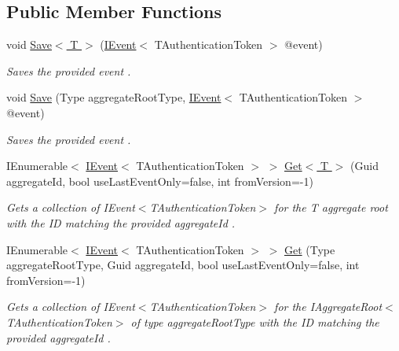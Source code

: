 \subsection*{Public Member Functions}
\begin{DoxyCompactItemize}
\item 
void \hyperlink{interfaceCqrs_1_1Events_1_1IEventStore_a92e768243d6602d09b786bbd06811ce6_a92e768243d6602d09b786bbd06811ce6}{Save$<$ T $>$} (\hyperlink{interfaceCqrs_1_1Events_1_1IEvent}{I\+Event}$<$ T\+Authentication\+Token $>$ @event)
\begin{DoxyCompactList}\small\item\em Saves the provided {\itshape event} . \end{DoxyCompactList}\item 
void \hyperlink{interfaceCqrs_1_1Events_1_1IEventStore_a81fb586703e7c6dea6b23d9a95f3887a_a81fb586703e7c6dea6b23d9a95f3887a}{Save} (Type aggregate\+Root\+Type, \hyperlink{interfaceCqrs_1_1Events_1_1IEvent}{I\+Event}$<$ T\+Authentication\+Token $>$ @event)
\begin{DoxyCompactList}\small\item\em Saves the provided {\itshape event} . \end{DoxyCompactList}\item 
I\+Enumerable$<$ \hyperlink{interfaceCqrs_1_1Events_1_1IEvent}{I\+Event}$<$ T\+Authentication\+Token $>$ $>$ \hyperlink{interfaceCqrs_1_1Events_1_1IEventStore_add6227e2978ff8656aad79b1a51bf34c_add6227e2978ff8656aad79b1a51bf34c}{Get$<$ T $>$} (Guid aggregate\+Id, bool use\+Last\+Event\+Only=false, int from\+Version=-\/1)
\begin{DoxyCompactList}\small\item\em Gets a collection of I\+Event$<$\+T\+Authentication\+Token$>$ for the {\itshape T} aggregate root with the ID matching the provided {\itshape aggregate\+Id} . \end{DoxyCompactList}\item 
I\+Enumerable$<$ \hyperlink{interfaceCqrs_1_1Events_1_1IEvent}{I\+Event}$<$ T\+Authentication\+Token $>$ $>$ \hyperlink{interfaceCqrs_1_1Events_1_1IEventStore_ae02ef6c804d0c4a92705a447bc4b2214_ae02ef6c804d0c4a92705a447bc4b2214}{Get} (Type aggregate\+Root\+Type, Guid aggregate\+Id, bool use\+Last\+Event\+Only=false, int from\+Version=-\/1)
\begin{DoxyCompactList}\small\item\em Gets a collection of I\+Event$<$\+T\+Authentication\+Token$>$ for the I\+Aggregate\+Root$<$\+T\+Authentication\+Token$>$ of type {\itshape aggregate\+Root\+Type}  with the ID matching the provided {\itshape aggregate\+Id} . \end{DoxyCompactList}\item 

\end{DoxyCompactItemize}
